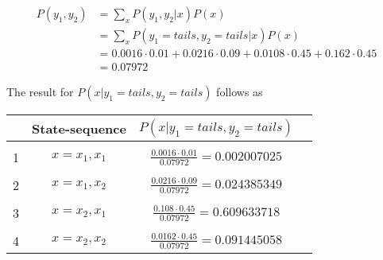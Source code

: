 \documentclass[a4paper, 12pt, titlepage]{article}
\begin{document}
\begin{align}
  P(y_1,y_2) &= \sum_{x} P(y_1,y_2|x) P(x)  \\
	     &= \sum_{x} P(y_1=tails,y_2=tails|x) P(x) \\
	     &= 0.0016 \cdot 0.01 + 0.0216 \cdot 0.09 + 0.0108 \cdot 0.45 + 0.162 \cdot 0.45 \\
	     &= 0.07972
\end{align}

The result for $P(x|y_1=tails,y_2=tails)$ follows as

\begin{tabular}{l*{2}{c}r}
              & State-sequence &  $P(x|y_1=tails,y_2=tails)$ & \\
\hline
& & & \\
1 & $x=x_1,x_1$ & $\frac{0.0016 \cdot 0.01}{0.07972} = 0.002007025$ \\
& & & \\
2 & $x=x_1,x_2$ & $\frac{0.0216 \cdot 0.09}{0.07972} = 0.024385349$ \\
& & & \\
3 & $x=x_2,x_1$ & $\frac{0.108 \cdot 0.45}{0.07972} = 0.609633718$ \\
& & & \\
4 & $x=x_2,x_2$ & $\frac{0.0162 \cdot 0.45}{0.07972} = 0.091445058 $ 
 \end{tabular}
\end{document}
